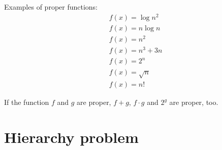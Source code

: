 \documentclass[a4]{scrartcl}
\begin{document}
Examples of proper functions: \cite{book} 
\begin{align*}
\ & f(x) = \log n^2 \\
\ & f(x) = n \log n \\
\ & f(x) = n^2 \\
\ & f(x) = n^3 +3n \\
\ & f(x) = 2^n \\
\ & f(x) = \sqrt{n} \\
\ & f(x) = n!
\end{align*}

If the function $f$ and $g$ are proper, $f+g$, $f \cdot g$ and $2^g$ are proper, too.















\section*{Hierarchy problem}



\newpage

\printbibliography
\end{document}
